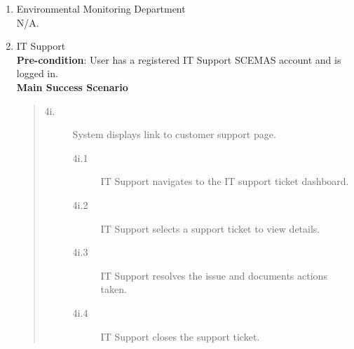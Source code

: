 \documentclass[]{article}
\begin{document}
\begin{enumerate}[{\bf BE8.}]
\begin{enumerate}[{\bf VP1.}]
			\item Environmental Monitoring Department \\
				    N/A.

			\item IT Support \\
                \textbf{Pre-condition}: User has a registered IT Support SCEMAS account and is logged in. \\
                \textbf{Main Success Scenario}
                \begin{quote}
    \begin{description}
        \item[\textmd{4i.}] System displays link to customer support page.
        \begin{description}
            \item[\textmd{4i.1}] IT Support navigates to the IT support ticket dashboard.
            \item[\textmd{4i.2}] IT Support selects a support ticket to view details.
            \item[\textmd{4i.3}] IT Support resolves the issue and documents actions taken.
            \item[\textmd{4i.4}] IT Support closes the support ticket.
        \end{description}
    \end{description}
\end{quote}



\end{enumerate}
\end{enumerate}
\end{document}
